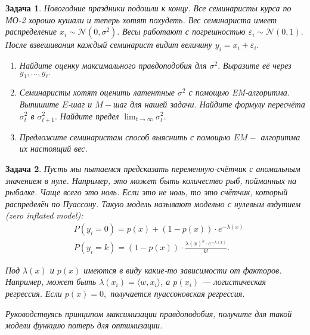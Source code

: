 \documentclass[12pt,fleqn]{article}
\newtheorem{esProblem}{Задача}
\begin{document}
\begin{esProblem}
    Новогодние праздники подошли к концу. Все семинаристы курса по МО-2 хорошо кушали и теперь хотят похудеть. Вес семинариста имеет распределение $x_i \sim \mathcal{N}(0, \sigma^2).$ Весы работают с погрешностью $\varepsilon_i \sim \mathcal{N}(0,1).$ После взвешивания каждый семинарист видит величину  $y_i = x_i + \varepsilon_i.$ 
    \begin{enumerate} 
        \item[а)] Найдите оценку максимального правдоподобия для $\sigma^2.$ Выразите её через $y_1, \ldots, y_{\ell}.$
        
        \item[б)] Семинаристы хотят оценить латентные $\sigma^2$ с помощью EM-алгоритма. Выпишите $E$-шаг и $M-$шаг для нашей задачи. Найдите формулу пересчёта $\sigma^2_t$ в $\sigma^2_{t+1}.$ Найдите предел $\lim_{t \to \infty} \sigma^2_t.$
        
        \item[в)] Предложите семинаристам способ выяснить с помощью $EM-$ алгоритма их настоящий вес. 
    \end{enumerate}
\end{esProblem}

\begin{esProblem}
    Пусть мы пытаемся предсказать переменную-счётчик с аномальным значением в нуле. Например, это может быть количество рыб, пойманных на рыбалке. Чаще всего это ноль. Если это не ноль, то это счётчик, который распределён по Пуассону. Такую модель называют \textit{моделью с нулевым вздутием (zero inflated model)}:
    \begin{equation*}
        \begin{aligned}
            & P(y_i = 0) = p(x) + (1 - p(x))\cdot e^{-\lambda(x)}\\
            & P(y_i = k) = (1 - p(x))\cdot \frac{\lambda(x)^k \cdot e^{-\lambda(x)}}{k!}.
        \end{aligned}
    \end{equation*}
    
    Под $\lambda(x)$ и $p(x)$ имеются в виду какие-то зависимости от факторов. Например, может быть $\lambda(x_i) = \langle w, x_i \rangle$, а $p(x_i)$ --- логистическая регрессия. Если $p(x) = 0,$ получается пуассоновская регрессия. 
    
    Руководствуясь принципом максимизации правдоподобия, получите для такой модели функцию потерь для оптимизации.
\end{esProblem}
\end{document}
